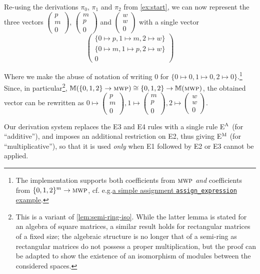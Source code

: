 \documentclass[runningheads]{llncs}
\makeatletter
\newcommand{\mat}[1]{\left(\begin{smallmatrix}#1\end{smallmatrix}\right)} %
\newcommand*{\eg}{e.g.\@\xspace}
\newcommand*{\cf}{cf.\@\xspace}
\makeatother
\begin{document}
\begin{example}
	Re-using the derivations \(\pi_0\), \(\pi_1\) and \(\pi_2\) from \autoref{ex:start}, we can now represent the three vectors \(\mat{p\\m\\0}\), \(\mat{m\\p\\0}\) and \(\mat{w\\w\\0}\) with a single vector
	\[
		\mat{\{ 0 \mapsto p, 1 \mapsto m, 2 \mapsto w\} \\ \{0 \mapsto m, 1 \mapsto p, 2 \mapsto w\} \\ 0}
	\]

	Where we make the abuse of notation of writing \(0\) for \(\{0 \mapsto 0, 1 \mapsto 0, 2 \mapsto 0\}\).\footnote{The implementation supports both coefficients from \(\textsc{mwp}\) \emph{and} coefficients from \(\{0, 1, 2\}^m \to \textsc{mwp}\), \cf \eg \href{https://seiller.github.io/pymwp/demo/\#basics_assign_expression.c}{a simple assignment \texttt{assign\_expression} example}.}
	Since, in particular\footnote{This is a variant of \autoref{lem:semi-ring-iso}. While the latter lemma is stated for an algebra of square matrices, a similar result holds for rectangular matrices of a fixed size; the algebraic structure is no longer that of a semi-ring as rectangular matrices do not possess a proper multiplication, but the proof can be adapted to show the existence of an isomorphism of modules between the considered spaces.}, \(\mathbb{M}(\{0, 1, 2\} \to\textsc{mwp}) \cong \{0, 1, 2\} \to \mathbb{M}(\textsc{mwp})\), the obtained vector can be rewritten as \(0 \mapsto \mat{p\\m\\0}, 1 \mapsto \mat{m\\p\\0}, 2 \mapsto \mat{w\\w\\0}\).

\end{example}

Our derivation system replaces the E3 and E4 rules with a single rule E\(^{\textsc{A}}\) (for \enquote{additive}), and imposes an additional restriction on E2, thus giving E\(^{\textsc{M}}\) (for \enquote{multiplicative}), so that it is used \emph{only} when E1 followed by E2 or E3 cannot be applied.
\end{document}
